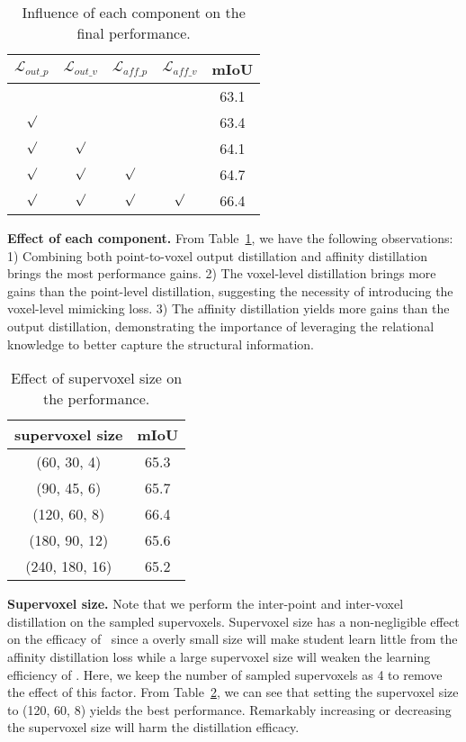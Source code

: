 \begin{table}[!t]
\caption{Influence of each component on the final performance.}
\label{each_component_table}
\centering
\vskip -0.3cm
\small{
\begin{tabular}{c|c|c|c|c}
\hline
$\mathcal{L}_{out\_p}$ & $\mathcal{L}_{out\_v}$ & $\mathcal{L}_{aff\_p}$ & $\mathcal{L}_{aff\_v}$ & mIoU \\
\hline
        &         &         &         &  63.1 \\
$\surd$ &         &         &         &  63.4 \\
$\surd$ & $\surd$ &         &         &  64.1 \\
$\surd$ & $\surd$ & $\surd$ &         &  64.7 \\
$\surd$ & $\surd$ & $\surd$ & $\surd$ &  66.4 \\
\hline
\end{tabular}
}
\vspace{-4ex}
\end{table}


\noindent \textbf{Effect of each component.} From Table~\ref{each_component_table}, we have the following observations: 1) Combining both point-to-voxel output distillation and affinity distillation brings the most performance gains. 2) The voxel-level distillation brings more gains than the point-level distillation, suggesting the necessity of introducing the voxel-level mimicking loss. 3) The affinity distillation yields more gains than the output distillation, demonstrating the importance of leveraging the relational knowledge to better capture the structural information. 

\begin{table}[!t]
\caption{Effect of supervoxel size on the performance.}
\label{supervoxel_size_table}
\centering
\vskip -0.3cm
\small{
\begin{tabular}{c|c}
\hline
supervoxel size & mIoU \\
\hline
(60, 30, 4) & 65.3 \\
\hline
(90, 45, 6) & 65.7 \\
\hline
(120, 60, 8) & 66.4 \\
\hline
(180, 90, 12) & 65.6 \\
\hline
(240, 180, 16) & 65.2 \\
\hline
\end{tabular}
}
\vspace{-3ex}
\end{table}

\noindent \textbf{Supervoxel size.} Note that we perform the inter-point and inter-voxel distillation on the sampled supervoxels. Supervoxel size has a non-negligible effect on the efficacy of \algorithmname~since a overly small size will make student learn little from the affinity distillation loss while a large supervoxel size will weaken the learning efficiency of \algorithmname. Here, we keep the number of sampled supervoxels as 4 to remove the effect of this factor. From Table~\ref{supervoxel_size_table}, we can see that setting the supervoxel size to (120, 60, 8) yields the best performance. Remarkably increasing or decreasing the supervoxel size will harm the distillation efficacy.   



